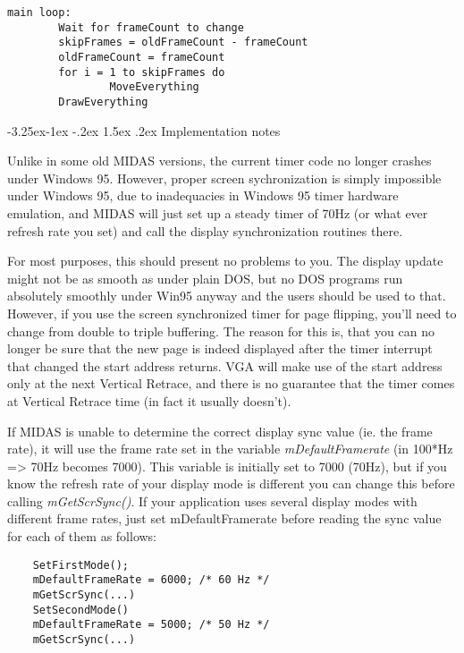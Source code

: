 \documentclass[a4paper,12pt,oneside]{book}
\makeatletter
\renewcommand\subsection{\@startsection{subsection}{2}{-20pt}%
                                     {-3.25ex\@plus -1ex \@minus -.2ex}%
                                     {1.5ex \@plus .2ex}%
                                     {\normalfont\large\bfseries}}
\makeatother
\begin{document}
\begin{verbatim}
main loop:
        Wait for frameCount to change
        skipFrames = oldFrameCount - frameCount
        oldFrameCount = frameCount
        for i = 1 to skipFrames do
                MoveEverything
        DrawEverything
\end{verbatim}


\subsection{Implementation notes}

Unlike in some old MIDAS versions, the current timer code no longer crashes
under Windows 95. However, proper screen sychronization is simply impossible
under Windows 95, due to inadequacies in Windows 95 timer hardware
emulation, and MIDAS will just set up a steady timer of 70Hz (or what ever
refresh rate you set) and call the display synchronization routines there.

For most purposes, this should present no problems to you. The display update
might not be as smooth as under plain DOS, but no DOS programs run absolutely
smoothly under Win95 anyway and the users should be used to that. However, if
you use the screen synchronized timer for page flipping, you'll need to
change from double to triple buffering. The reason for this is, that you can
no longer be sure that the new page is indeed displayed after the timer
interrupt that changed the start address returns. VGA will make use of the
start address only at the next Vertical Retrace, and there is no guarantee
that the timer comes at Vertical Retrace time (in fact it usually doesn't).

If MIDAS is unable to determine the correct display sync value (ie. the frame
rate), it will use the frame rate set in the variable {\em mDefaultFramerate}
(in 100*Hz => 70Hz becomes 7000). This variable is initially set to 7000
(70Hz), but if you know the refresh rate of your display mode is different
you can change this before calling {\em mGetScrSync()}. If your application
uses several display modes with different frame rates, just set
mDefaultFramerate before reading the sync value for each of them as follows:

\begin{verbatim}
    SetFirstMode();
    mDefaultFrameRate = 6000; /* 60 Hz */
    mGetScrSync(...)
    SetSecondMode()
    mDefaultFrameRate = 5000; /* 50 Hz */
    mGetScrSync(...)
\end{verbatim}
\end{document}
